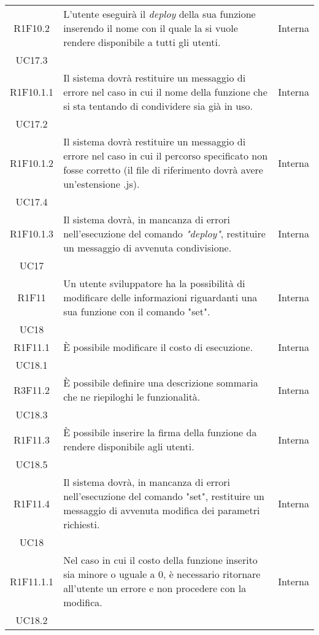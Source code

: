 \begin{longtable}{|c|p{8cm}|C{2cm}|}
	R1F10.2 &  L'utente eseguirà il \textit{deploy\glo} della sua funzione inserendo il nome con il quale la si vuole rendere disponibile a tutti gli utenti. & \centering Interna \\ UC17.3 \tabularnewline

	R1F10.1.1 &  Il sistema dovrà restituire un messaggio di errore nel caso in cui il nome della funzione che si sta tentando di condividere sia già in uso. & \centering Interna \\ UC17.2 \tabularnewline

	R1F10.1.2 &  Il sistema dovrà restituire un messaggio di errore nel caso in cui il percorso specificato non fosse corretto (il file di riferimento dovrà avere un'estensione .js). & \centering Interna \\ UC17.4 \tabularnewline

	R1F10.1.3 &  Il sistema dovrà, in mancanza di errori nell'esecuzione del comando \textit{"deploy\glos"}, restituire un messaggio di avvenuta condivisione. & \centering Interna \\ UC17 \tabularnewline

	R1F11 &  Un utente sviluppatore ha la possibilità di modificare delle informazioni riguardanti una sua funzione con il comando "set". & \centering Interna \\ UC18 \tabularnewline

	R1F11.1 &  È possibile modificare il costo di esecuzione. & \centering Interna \\ UC18.1 \tabularnewline

	R3F11.2 &  È possibile definire una descrizione sommaria che ne riepiloghi le funzionalità. & \centering Interna \\ UC18.3 \tabularnewline

	R1F11.3 &  È possibile inserire la firma della funzione da rendere disponibile agli utenti. & \centering Interna \\ UC18.5 \tabularnewline

	R1F11.4 &  Il sistema dovrà, in mancanza di errori nell'esecuzione del comando "set", restituire un messaggio di avvenuta modifica dei parametri richiesti. & \centering Interna \\ UC18 \tabularnewline

	R1F11.1.1 &  Nel caso in cui il costo della funzione inserito sia minore o uguale a 0, è necessario ritornare all'utente un errore e non procedere con la modifica. & \centering Interna \\ UC18.2 \tabularnewline


\end{longtable}

